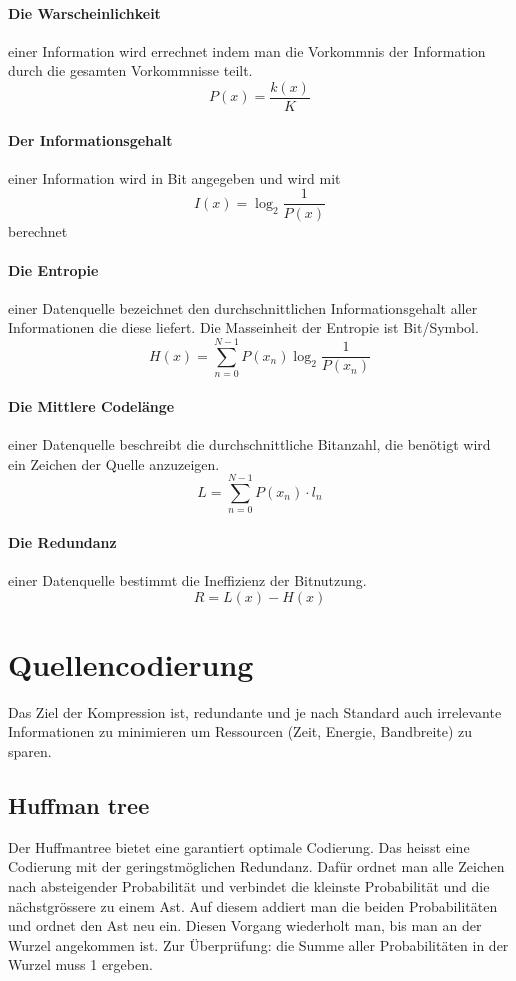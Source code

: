 \documentclass{article}
\begin{document}
\paragraph{Die Warscheinlichkeit} einer Information wird errechnet indem man die Vorkommnis der Information durch die gesamten Vorkommnisse teilt. \[
		P(x) = \frac{k(x)}{K} 
\]
\paragraph{Der Informationsgehalt} einer Information wird in Bit angegeben und wird mit \[
		I(x)= \log_{2} \frac{1}{P(x)}
\]
berechnet
\paragraph{Die Entropie} einer Datenquelle bezeichnet den durchschnittlichen Informationsgehalt aller Informationen die diese liefert. Die Masseinheit der Entropie ist Bit/Symbol.
\[
		H(x) = \sum_{n=0}^{N-1} P(x_n) \log_{2} \frac{1}{P(x_n)}
\]
\paragraph{Die Mittlere Codelänge} einer Datenquelle beschreibt die durchschnittliche Bitanzahl, die benötigt wird ein Zeichen der Quelle anzuzeigen.
\[
		L = \sum_{n=0}^{N-1} P(x_n) \cdot l_n 
\]
\paragraph{Die Redundanz} einer Datenquelle bestimmt die Ineffizienz der Bitnutzung. \[
		R = L(x) - H(x)
\]

\section{Quellencodierung}
Das Ziel der Kompression ist, redundante und je nach Standard auch irrelevante Informationen zu minimieren um Ressourcen (Zeit, Energie, Bandbreite) zu sparen.
\subsection{Huffman tree}
Der Huffmantree bietet eine garantiert optimale Codierung. Das heisst eine Codierung mit der geringstmöglichen Redundanz. Dafür ordnet man alle Zeichen nach absteigender Probabilität und verbindet die kleinste Probabilität und die nächstgrössere zu einem Ast. Auf diesem addiert man die beiden Probabilitäten und ordnet den Ast neu ein. Diesen Vorgang wiederholt man, bis man an der Wurzel angekommen ist. Zur Überprüfung: die Summe aller Probabilitäten in der Wurzel muss 1 ergeben.
\end{document}
